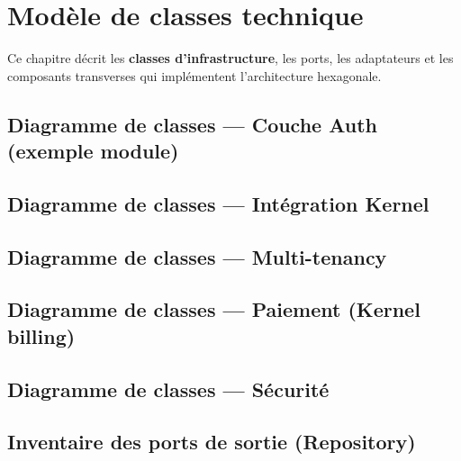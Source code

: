 \chapter{Modèle de classes technique}

Ce chapitre décrit les \textbf{classes d'infrastructure}, les ports, les adaptateurs
et les composants transverses qui implémentent l'architecture hexagonale.

\section{Diagramme de classes — Couche Auth (exemple module)}


\section{Diagramme de classes — Intégration Kernel}


\section{Diagramme de classes — Multi-tenancy}


\section{Diagramme de classes — Paiement (Kernel billing)}


\section{Diagramme de classes — Sécurité}


\section{Inventaire des ports de sortie (Repository)}

